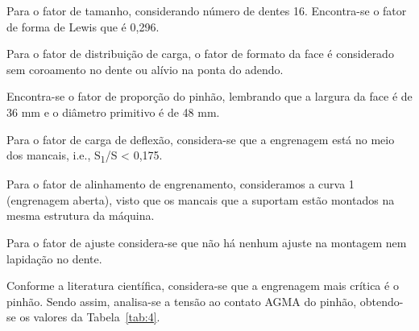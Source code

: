 \documentclass[12pt,a4paper]{article}
\begin{document}
Para o fator de tamanho, considerando número de dentes 16. Encontra-se o
fator de forma de Lewis que é 0,296.

Para o fator de distribuição de carga, o fator de formato da face é
considerado sem coroamento no dente ou alívio na ponta do adendo.

Encontra-se o fator de proporção do pinhão, lembrando que a largura da
face é de 36 mm e o diâmetro primitivo é de 48 mm.

Para o fator de carga de deflexão, considera-se que a engrenagem está no
meio dos mancais, i.e., S\textsubscript{1}/S \textless{} 0,175.

Para o fator de alinhamento de engrenamento, consideramos a curva 1
(engrenagem aberta), visto que os mancais que a suportam estão montados
na mesma estrutura da máquina.

Para o fator de ajuste considera-se que não há nenhum ajuste na montagem
nem lapidação no dente.

Conforme a literatura científica, considera-se que a engrenagem mais
crítica é o pinhão. Sendo assim, analisa-se a tensão ao contato AGMA do
pinhão, obtendo-se os valores da Tabela~{\ref{tab:4}}.
\end{document}

